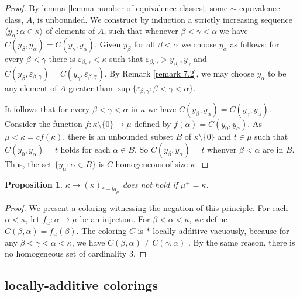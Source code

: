\documentclass[11pt]{amsart}
\theoremstyle{plain}
\newtheorem{proposition}[theorem]{Proposition}
\theoremstyle{definition} %
\theoremstyle{remark}
\renewcommand{\epsilon}{\varepsilon}
\begin{document}
\begin{proof}
 By lemma \ref{lemma number of equivalence classes}, some $\sim$-equivalence class, $A$, is unbounded. We construct by induction a strictly increasing sequence $\langle y_\alpha:\alpha \in \kappa\rangle$ of elements of $A$, such that whenever $\beta<\gamma<\alpha$ we have $C(y_\beta,y_\alpha)=C(y_\gamma,y_\alpha)$. Given $y_\beta$ for all $\beta<\alpha$ we choose $y_\alpha$ as follows: for every $\beta<\gamma$ there is $\epsilon_{\beta,\gamma}<\kappa$ such that $\epsilon_{\beta,\gamma}>y_{\beta,},y_{\gamma}$ and $C(y_\beta,\epsilon_{\beta,\gamma})=C(y_\gamma,\epsilon_{\beta,\gamma})$. By Remark \ref{remark 7.2}, we may choose $y_\alpha$ to be any element of $A$ greater than $\sup\{\epsilon_{\beta,\gamma}: \beta<\gamma<\alpha\}$.

It follows that for every $\beta<\gamma<\alpha$ in $\kappa$ we have $C(y_\beta,y_\alpha)=C(y_\gamma,y_\alpha)$. Consider the function $f:\kappa \setminus \{0\} \to \mu$ defined by $f(\alpha)=C(y_0,y_\alpha)$. As $\mu<\kappa=cf(\kappa)$, there is an unbounded subset $B$ of $\kappa \setminus \{0\}$ and $t \in \mu$ such that $C(y_0,y_\alpha)=t$ holds for each $\alpha \in B$. So $C(y_\beta,y_\alpha)=t$ whenver $\beta<\alpha$ are in $B$. Thus, the set  $\{y_\alpha:\alpha \in B \}$ is $C$-homogeneous of size $\kappa$.
\end{proof}

\begin{proposition}\label{proposition mu^+<kappa can's be omitted}
$\kappa \rightarrow (\kappa)_{*-la_\mu}$ does not hold if $\mu^+=\kappa$.
\end{proposition}

\begin{proof}
We present a coloring witnessing the negation of this principle. For each $\alpha<\kappa$, let $f_\alpha:\alpha \to \mu$ be an injection. For $\beta<\alpha<\kappa$, we define $C(\beta,\alpha)=f_\alpha(\beta)$. The coloring $C$ is $*$-locally additive vacuously, because for any $\beta<\gamma<\alpha<\kappa$, we have $C(\beta,\alpha) \neq C(\gamma,\alpha)$ . By the same reason, there is no homogeneous set of cardinality $3$.
\end{proof}





\subsection{locally-additive colorings}
\end{document}
